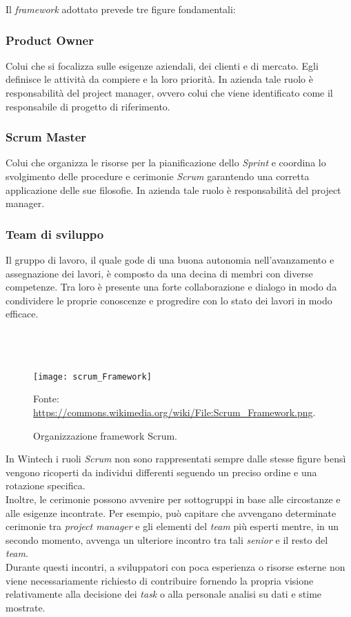 \noindent Il \emph{framework} adottato prevede tre figure fondamentali: 
\subsubsection*{Product Owner}
Colui che si focalizza sulle esigenze aziendali, dei clienti e di mercato. Egli definisce le attività da compiere e la loro priorità.
In azienda tale ruolo è responsabilità del \gls{project manager}, ovvero colui che viene identificato come il responsabile di progetto di riferimento. 

\subsubsection*{Scrum Master}
Colui che organizza le risorse per la pianificazione dello \emph{Sprint} e coordina lo svolgimento delle procedure e cerimonie \emph{Scrum} garantendo una corretta applicazione delle sue filosofie.
In azienda tale ruolo è responsabilità del \gls{project manager}. 

\subsubsection*{Team di sviluppo}
Il gruppo di lavoro, il quale gode di una buona autonomia nell'avanzamento e assegnazione dei lavori, è composto da una decina di membri con diverse competenze. Tra loro è presente una forte collaborazione e dialogo in modo da condividere le proprie conoscenze e progredire con lo stato dei lavori in modo efficace.\\\\\\\\
\begin{figure}[htbp] 
    \centering 
    \texttt{[image: scrum\_Framework]} 
    \caption{Organizzazione framework Scrum.}
    \label{fig:scrum_framework}
    \vspace{1mm}
    Fonte: \url{https://commons.wikimedia.org/wiki/File:Scrum_Framework.png}.
\end{figure}
\newpage \noindent In Wintech i ruoli \emph{Scrum} non sono rappresentati sempre dalle stesse figure bensì vengono ricoperti da individui differenti seguendo un preciso ordine e una rotazione specifica.\\
Inoltre, le cerimonie possono avvenire per sottogruppi in base alle circostanze e alle esigenze incontrate. Per esempio, può capitare che avvengano determinate cerimonie tra \emph{project manager} e gli elementi del \emph{team} più esperti mentre, in un secondo momento, avvenga un ulteriore incontro tra tali \emph{senior} e il resto del \emph{team}.\\
Durante questi incontri, a sviluppatori con poca esperienza o risorse esterne non viene necessariamente richiesto di contribuire fornendo la propria visione relativamente alla decisione dei \emph{task} o alla personale analisi su dati e stime mostrate.\\\\

